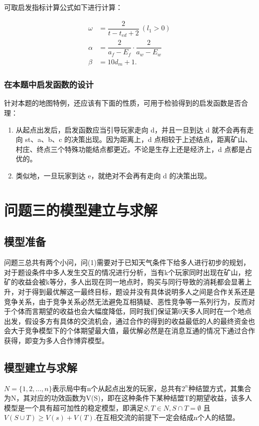 \documentclass[a4paper]{ctexart}
\begin{document}
可取启发指标计算公式如下进行计算：

\begin{align*}
    \omega &= \dfrac{2}{t - t_{ed} + 2}\ (l_1 > 0)\\
    \alpha &= \dfrac{2}{a_f - E_f} \cdot \dfrac{2}{a_w - E_w}\\
    \beta &= 10 d_m + 1
.\end{align*}

\subsubsection{在本题中启发函数的设计}

针对本题的地图特例，还应该有下面的性质，可用于检验得到的启发函数是否合理：

\begin{enumerate}
    \item 从起点出发后，启发函数应当引导玩家走向 d，并且一旦到达 d 就不会再有走向 st、a、b、c 的决策出现。因为距离上，d 点相较于上述结点，距离矿山、村庄、终点三个特殊功能结点都更近。不论是生存上还是经济上，d 点都是占优的。
    \item 类似地，一旦玩家到达 e，就绝对不会再有走向 d 的决策出现。
\end{enumerate}

\section{问题三的模型建立与求解}

\subsection{模型准备}
问题三总共有两个小问，问(1)需要对于已知天气条件下给多人进行初步的规划，对于题设条件中多人发生交互的情况进行分析，当有k个玩家同时出现在矿山，挖矿的收益会被k等分，多人出现在同一地点时，购买与同行导致的消耗都会显著上升，对于得到最优解这一最终目标，题设并没有具体说明多人之间是合作关系还是竞争关系，由于竞争关系必然无法避免互相猜疑、恶性竞争等一系列行为，反而对于个体而言期望的收益也会大幅度降低，同时我们保证第0天多人同时在一个地点出发，假设多方有具体的交流机会，通过合作的得到的收益最低的人的最终资金也会大于竞争模型下的个体期望最大值，最优解必然是在消息互通的情况下通过合作获得，即变为多人合作博弈模型。


\subsection{模型建立与求解}
$N=\{1,2,...,n\}$表示局中有n个从起点出发的玩家，总共有$2^{n}$种结盟方式，其集合为N，其对应的功效函数为V(S)，即在这种条件下某种结盟T的期望收益，该多人模型是一个具有超可加性的稳定模型，即满足$S,T\in N,S\cap T=\emptyset$ 且$V(S\cup T)\geq V(s)+V(T)$.在互相交流的前提下一定会结成n个人的结盟。
\end{document}
